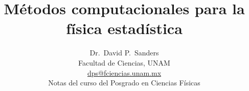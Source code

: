 \documentclass[10pt,twoside,openany, letterpaper]{book}
\begin{document}
\newcommand{\captionfonts}{\small}

\newcommand{\defn}[1]{\emph{#1}}


\makeatletter  %
\long\def\@makecaption#1#2{%
  \begin{quotation}
  \vskip\abovecaptionskip
  \sbox\@tempboxa{{\captionfonts \noindent \textbf{#1}: #2}}%
  \ifdim \wd\@tempboxa >\hsize
    {\captionfonts \noindent \textbf{#1}: #2\par}
  \else
    \hbox to\hsize{\hfil\box\@tempboxa\hfil}%
  \fi
  \vskip\belowcaptionskip \end{quotation}}
\makeatother   %

\renewcommand{\figurename}{Fig.}



\title{\textbf{Métodos computacionales para la física estadística}}
\author{\Large Dr.~David P.~Sanders\\Facultad de Ciencias, UNAM\\
\url{dps@fciencias.unam.mx}\\[20pt]
Notas del curso del Posgrado en Ciencias Físicas 
}
\maketitle

 \setcounter{page}{1}

\let\v\verb

\let\inl\lstinline

\newcommand{\ejercicio}{\textbf{Ejercicio: }}

\renewcommand{\vec}[1]{\mathbf{#1}}
\newcommand{\xx}{\vec{x}}


\pagebreak
{}

% 
% 
% 
% 
% 
% 
% 
% 
% 
% 
% 








%

\end{document}
